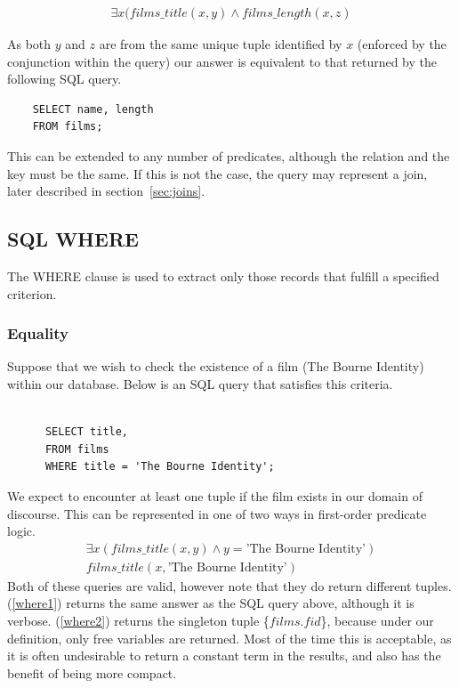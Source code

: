 \documentclass[a4paper, 11pt]{article}
\begin{document}
    \begin{gather}
      \exists x(films\_title(x, y) \land films\_length(x, z)
    \end{gather}

    As both $y$ and $z$ are from the same unique tuple identified by $x$
    (enforced by the conjunction within the query) our
    answer is equivalent to that returned by the following SQL query.

    \begin{verbatim}
    SELECT name, length
    FROM films;
    \end{verbatim}

    This can be extended to any number of predicates, although the relation and
    the key must be the same. If this is not the case, the query may represent
    a join, later described in section~\ref{sec:joins}.

  \subsection{SQL WHERE}

    The WHERE clause is used to extract only those records that fulfill a
    specified criterion.~\cite{w3WHERE} 

    \subsubsection{Equality}

      Suppose that we wish to check the existence of a film (The Bourne
      Identity) within our database. Below is an SQL query that satisfies this
      criteria.

      \begin{verbatim}

      SELECT title,
      FROM films
      WHERE title = 'The Bourne Identity';

      \end{verbatim}

      We expect to encounter at least one tuple if the film exists in our domain
      of discourse.  This can be represented
      in one of two ways in first-order predicate logic.
      \begin{gather}
        \exists x(films\_title(x, y) \land y = \text{'The Bourne
        Identity'})\label{where1}\\
        films\_title(x, \text{'The Bourne Identity'})\label{where2}
      \end{gather}
      Both of these queries are valid, however note that they do return different
      tuples. (\ref{where1}) returns the same answer as the SQL query above, although
      it is verbose. (\ref{where2}) returns the singleton tuple \{$films.fid$\},
      because under our definition, only free variables are returned. Most of
      the time this is acceptable, as it is often undesirable to return a
      constant term in the results, and also has the benefit of being more
      compact.
\end{document}

